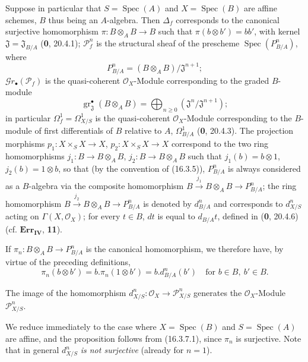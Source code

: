 \begin{env}[16.3.7]
\label{IV.16.3.7}
Suppose in particular that $S=\operatorname{Spec}(A)$ and
$X=\operatorname{Spec}(B)$ are affine schemes, $B$ thus being an
$A$-algebra. Then $\Delta_f$ corresponds to the canonical surjective homomorphism
$\pi:B\otimes_A B\to B$ such that $\pi(b\otimes b')=bb'$, with kernel
$\mathfrak{J}=\mathfrak{J}_{B/A}$ (\textbf{0}, 20.4.1); $\mathscr{P}_f^n$ is the
structural sheaf of the prescheme $\operatorname{Spec}(P_{B/A}^n)$, where
\[
  P_{B/A}^n=(B\otimes_A B)/\mathfrak{J}^{n+1};
\]
$\mathscr{G}r_\bullet(\mathscr{P}_f)$ is the quasi-coherent
$\mathcal{O}_X$-Module corresponding to the graded $B$-module
\[
  \operatorname{gr}_{\mathfrak{J}}^\bullet(B\otimes_A B)
  =\bigoplus_{n\geq 0}(\mathfrak{J}^n/\mathfrak{J}^{n+1});
\]
in particular $\varOmega_f^1=\varOmega_{X/S}^1$ is the quasi-coherent
$\mathcal{O}_X$-Module corresponding to the $B$-module of first differentials of $B$
relative to $A$, $\Omega_{B/A}^1$ (\textbf{0}, 20.4.3). The projection morphisms
$p_1:X\times_S X\to X$, $p_2:X\times_S X\to X$ correspond to the two
ring homomorphisms $j_1:B\to B\otimes_A B$, $j_2:B\to B\otimes_A B$
such that $j_1(b)=b\otimes 1$, $j_2(b)=1\otimes b$, so that (by the
convention of (16.3.5)), $P_{B/A}^n$ is always considered as a
$B$-algebra via the composite homomorphism
$B\xrightarrow{j_1}B\otimes_A B\to P_{B/A}^n$; the ring homomorphism
$B\xrightarrow{j_2}B\otimes_A B\to P_{B/A}^n$ is denoted by $d_{B/A}^n$ and corresponds
to $d_{X/S}^n$ acting on $\Gamma(X,\mathcal{O}_X)$; for every $t\in B$, $dt$
is equal to $d_{B/A}t$, defined in (\textbf{0}, 20.4.6) (cf. $\mathbf{Err}_{\mathbf{IV}}$,
\textbf{11}).

If $\pi_n:B\otimes_A B\to P_{B/A}^n$ is the canonical homomorphism, we therefore have,
by virtue of the preceding definitions,
\[
  \pi_n(b\otimes b')=b.\pi_n(1\otimes b')=b.d_{B/A}^n(b')
  \quad\text{for }b\in B,\ b'\in B.
  \tag{16.3.7.1}
  \label{IV.16.3.7.1}
\]
\end{env}

\begin{proposition}[16.3.8]
\label{IV.16.3.8}
The image of the homomorphism $d_{X/S}^n:\mathcal{O}_X\to\mathscr{P}_{X/S}^n$
generates the $\mathcal{O}_X$-Module $\mathscr{P}_{X/S}^n$.
\end{proposition}

We reduce immediately to the case where $X=\operatorname{Spec}(B)$ and
$S=\operatorname{Spec}(A)$ are affine, and the proposition follows from (16.3.7.1),
since $\pi_n$ is surjective. Note that in general $d_{X/S}^n$ \emph{is not
surjective} (already for $n=1$).

